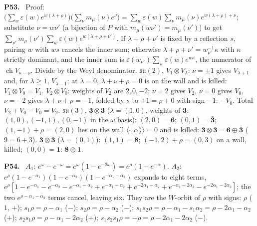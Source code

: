 \documentclass[11pt]{article}
\newenvironment{solution}[1]{\medskip\noindent\textbf{P#1.}\ }{\par\medskip}
\begin{document}
\begin{solution}{53}
Proof: $\big(\sum_w\varepsilon(w)e^{w(\lambda+\rho)}\big)\big(\sum_\nu m_\mu(\nu)e^{\nu}\big)
= \sum_w\varepsilon(w)\sum_{\nu}m_\mu(\nu)e^{w(\lambda+\rho)+\nu}$;
substitute $\nu = w\nu'$ (a bijection of $P$ with $m_\mu(w\nu') = m_\mu(\nu')$)
to get $\sum_{\nu'}m_\mu(\nu')\sum_w\varepsilon(w)e^{w(\lambda+\rho+\nu')}$.
If $\lambda+\rho+\nu'$ is fixed by a reflection $s$, pairing $w$ with $ws$
cancels the inner sum; otherwise $\lambda+\rho+\nu' = w_{\nu'}^{-1}\kappa$ with
$\kappa$ strictly dominant, and the inner sum is
$\varepsilon(w_{\nu'})\sum_w\varepsilon(w)e^{w\kappa}$, the numerator of
$\operatorname{ch}V_{\kappa-\rho}$. Divide by the Weyl denominator.
$\mathfrak{su}(2)$, $V_1\otimes V_\lambda$: $\nu = \pm1$ gives
$V_{\lambda+1}$ and, for $\lambda\ge1$, $V_{\lambda-1}$; at $\lambda = 0$,
$\lambda+\nu+\rho = 0$ is on the wall and is killed: $V_1\otimes V_0 = V_1$.
$V_2\otimes V_0$: weights of $V_2$ are $2,0,-2$; $\nu = 2$ gives $V_2$,
$\nu = 0$ gives $V_0$, $\nu = -2$ gives $\lambda+\nu+\rho = -1$, folded by
$s$ to $+1 = \rho+0$ with sign $-1$: $-V_0$. Total $V_2+V_0-V_0 = V_2$.
$\mathfrak{su}(3)$, $\mathbf3\otimes\mathbf3$ ($\lambda = (1,0)$, weights
of $\mathbf3$: $(1,0),(-1,1),(0,-1)$ in the $\omega$ basis):
$(2,0) = \mathbf6$; $(0,1) = \bar{\mathbf3}$; $(1,-1)+\rho = (2,0)$ lies on
the wall $\langle\cdot,\alpha_2^\vee\rangle = 0$ and is killed:
$\mathbf3\otimes\mathbf3 = \mathbf6\oplus\bar{\mathbf3}$ ($9 = 6+3$).
$\mathbf3\otimes\bar{\mathbf3}$ ($\lambda = (0,1)$): $(1,1) = \mathbf8$;
$(-1,2)+\rho = (0,3)$ on a wall, killed; $(0,0) = \mathbf1$:
$\mathbf8\oplus\mathbf1$.
\end{solution}

\begin{solution}{54}
$A_1$: $e^{\omega}-e^{-\omega} = e^{\omega}(1-e^{-2\omega}) = e^{\rho}(1-e^{-\alpha})$.
$A_2$: $e^{\rho}(1-e^{-\alpha_1})(1-e^{-\alpha_2})(1-e^{-\alpha_1-\alpha_2})$
expands to eight terms, $e^{\rho}[1-e^{-\alpha_1}-e^{-\alpha_2}-e^{-\alpha_1-\alpha_2}
+e^{-\alpha_1-\alpha_2}+e^{-2\alpha_1-\alpha_2}+e^{-\alpha_1-2\alpha_2}-e^{-2\alpha_1-2\alpha_2}]$;
the two $e^{\rho-\alpha_1-\alpha_2}$ terms cancel, leaving six. They are
the $W$-orbit of $\rho$ with signs: $\rho$ ($1$, $+$);
$s_1\rho = \rho-\alpha_1$ ($-$); $s_2\rho = \rho-\alpha_2$ ($-$);
$s_1s_2\rho = \rho-\alpha_1-s_1\alpha_2 = \rho-2\alpha_1-\alpha_2$ ($+$);
$s_2s_1\rho = \rho-\alpha_1-2\alpha_2$ ($+$);
$s_1s_2s_1\rho = -\rho = \rho-2\alpha_1-2\alpha_2$ ($-$).
\end{solution}
\end{document}
